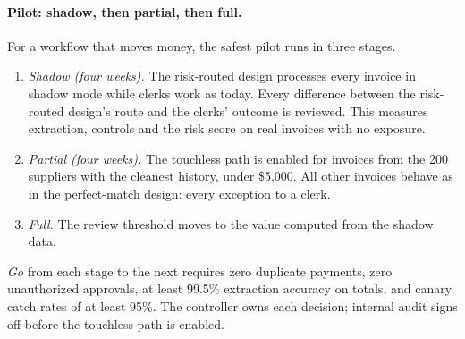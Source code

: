 \paragraph{Pilot: shadow, then partial, then full.} For a workflow that moves money, the safest pilot runs in three stages.
\begin{enumerate}[itemsep=1pt]
  \item \emph{Shadow (four weeks).} The risk-routed design processes every invoice in shadow mode while clerks work as today. Every difference between the risk-routed design's route and the clerks' outcome is reviewed. This measures extraction, controls and the risk score on real invoices with no exposure.
  \item \emph{Partial (four weeks).} The touchless path is enabled for invoices from the 200 suppliers with the cleanest history, under \$5{,}000. All other invoices behave as in the perfect-match design: every exception to a clerk.
  \item \emph{Full.} The review threshold moves to the value computed from the shadow data.
\end{enumerate}
\emph{Go} from each stage to the next requires zero duplicate payments, zero unauthorized approvals, at least 99.5\% extraction accuracy on totals, and canary catch rates of at least 95\%. The controller owns each decision; internal audit signs off before the touchless path is enabled.


